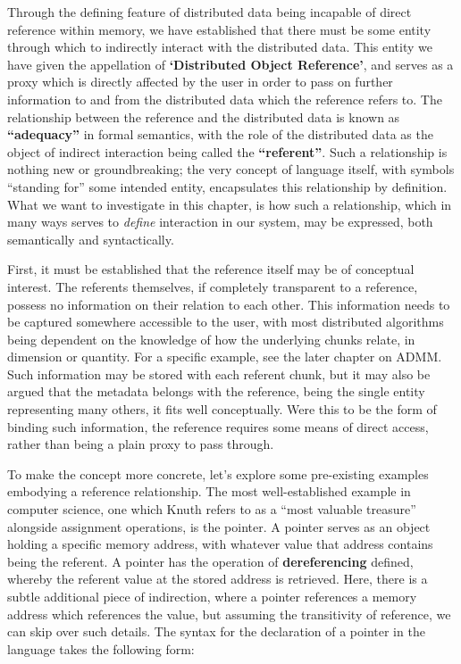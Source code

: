 Through the defining feature of distributed data being incapable of direct reference within memory, we have established that there must be some entity through which to indirectly interact with the distributed data.
This entity we have given the appellation of \textbf{`Distributed Object Reference'}, and serves as a proxy which is directly affected by the user in order to pass on further information to and from the distributed data which the reference refers to.
The relationship between the reference and the distributed data is known as \textbf{``adequacy''} in formal semantics, with the role of the distributed data as the object of indirect interaction being called the \textbf{``referent''}.
Such a relationship is nothing new or groundbreaking; the very concept of language itself, with symbols ``standing for'' some intended entity, encapsulates this relationship by definition.
What we want to investigate in this chapter, is how such a relationship, which in many ways serves to \emph{define} interaction in our system, may be expressed, both semantically and syntactically.

First, it must be established that the reference itself may be of conceptual interest.
The referents themselves, if completely transparent to a reference, possess no information on their relation to each other.
This information needs to be captured somewhere accessible to the user, with most distributed algorithms being dependent on the knowledge of how the underlying chunks relate, in dimension or quantity.
For a specific example, see the later chapter on ADMM.
Such information may be stored with each referent chunk, but it may also be argued that the metadata belongs with the reference, being the single entity representing many others, it fits well conceptually.
Were this to be the form of binding such information, the reference requires some means of direct access, rather than being a plain proxy to pass through.

To make the concept more concrete, let's explore some pre-existing examples embodying a reference relationship.
The most well-established example in computer science, one which Knuth refers to as a ``most valuable treasure'' alongside assignment operations, is the pointer.
A pointer serves as an object holding a specific memory address, with whatever value that address contains being the referent.
A pointer has the operation of \textbf{dereferencing} defined, whereby the referent value at the stored address is retrieved.
Here, there is a subtle additional piece of indirection, where a pointer references a memory address which references the value, but assuming the transitivity of reference, we can skip over such details.
The syntax for the declaration of a pointer in the  language takes the following form:

